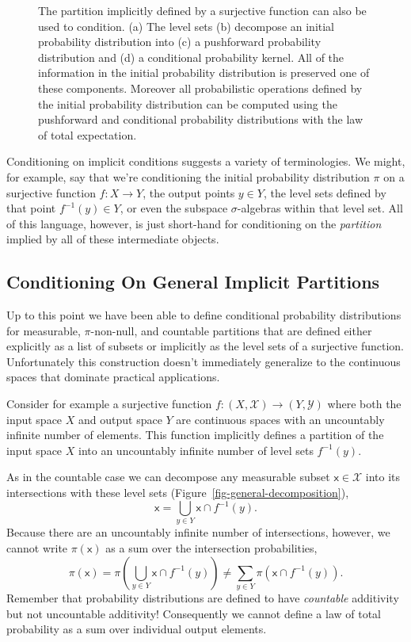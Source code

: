 \documentclass[
  letterpaper,
  DIV=11,
  numbers=noendperiod]{scrartcl}
\begin{document}
\begin{figure}
\begin{minipage}{0.83\linewidth}
\end{minipage}%

\caption{\label{fig-implicit-decomposition}The partition implicitly
defined by a surjective function can also be used to condition. (a) The
level sets (b) decompose an initial probability distribution into (c) a
pushforward probability distribution and (d) a conditional probability
kernel. All of the information in the initial probability distribution
is preserved one of these components. Moreover all probabilistic
operations defined by the initial probability distribution can be
computed using the pushforward and conditional probability distributions
with the law of total expectation.}

\end{figure}%

Conditioning on implicit conditions suggests a variety of terminologies.
We might, for example, say that we're conditioning the initial
probability distribution \(\pi\) on a surjective function
\(f : X \rightarrow Y\), the output points \(y \in Y\), the level sets
defined by that point \(f^{-1}(y) \in Y\), or even the subspace
\(\sigma\)-algebras within that level set. All of this language,
however, is just short-hand for conditioning on the \emph{partition}
implied by all of these intermediate objects.

\subsection{Conditioning On General Implicit
Partitions}\label{sec:general-conditional}

Up to this point we have been able to define conditional probability
distributions for measurable, \(\pi\)-non-null, and countable partitions
that are defined either explicitly as a list of subsets or implicitly as
the level sets of a surjective function. Unfortunately this construction
doesn't immediately generalize to the continuous spaces that dominate
practical applications.

Consider for example a surjective function
\(f: (X, \mathcal{X}) \rightarrow (Y, \mathcal{Y})\) where both the
input space \(X\) and output space \(Y\) are continuous spaces with an
uncountably infinite number of elements. This function implicitly
defines a partition of the input space \(X\) into an uncountably
infinite number of level sets \(f^{-1}(y)\).

As in the countable case we can decompose any measurable subset
\(\mathsf{x} \in \mathcal{X}\) into its intersections with these level
sets (Figure~\ref{fig-general-decomposition}), \[
\mathsf{x} = \bigcup_{y \in Y} \mathsf{x} \cap f^{-1}(y).
\] Because there are an uncountably infinite number of intersections,
however, we cannot write \(\pi(\mathsf{x})\) as a sum over the
intersection probabilities, \[
\pi( \mathsf{x} )
=
\pi \left( \bigcup_{y \in Y} \mathsf{x} \cap f^{-1}(y) \right)
\ne
\sum_{y \in Y} \pi( \mathsf{x} \cap f^{-1}(y) ).
\] Remember that probability distributions are defined to have
\emph{countable} additivity but not uncountable additivity! Consequently
we cannot define a law of total probability as a sum over individual
output elements.
\end{document}
